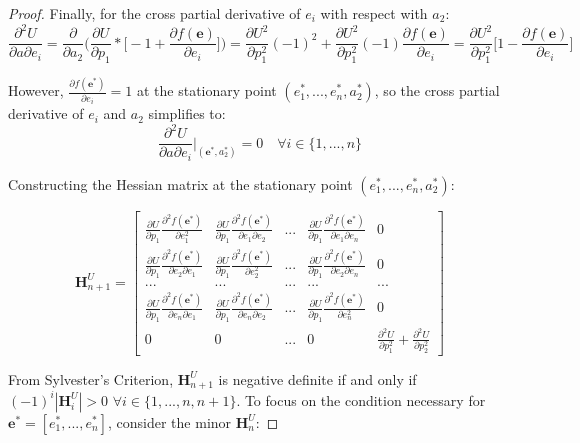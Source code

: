 \begin{proof}
Finally, for the cross partial derivative of $e_i$ with respect with $a_2$: $$\frac{\partial^2 U}{\partial a\partial e_i}=\frac{\partial}{\partial a_2}\bigg(\frac{\partial U}{\partial p_1}*\bigg[-1+\frac{\partial f(\mathbf{e})}{\partial e_i}\bigg]\bigg)=\frac{\partial U^2}{\partial p_1^2}(-1)^2+\frac{\partial U^2}{\partial p_1^2}(-1)\frac{\partial f(\mathbf{e})}{\partial e_i}=\frac{\partial U^2}{\partial p_1^2}\bigg[1-\frac{\partial f(\mathbf{e})}{\partial e_i}\bigg]$$

However, $\frac{\partial f(\mathbf{e^*})}{\partial e_i}=1$ at the stationary point $(e_1^*,...,e^*_n,a_2^*)$, so the cross partial derivative of $e_i$ and $a_2$ simplifies to:
$$\frac{\partial^2 U}{\partial a\partial e_i}\bigg|_{(\mathbf{e}^*,a^*_2)}=0\quad\forall i\in\{1,...,n\}$$

Constructing the Hessian matrix at the stationary point $(e^*_1,...,e^*_n,a^*_2)$:

$$\mathbf{H}^U_{n+1}=\begin{bmatrix}
\frac{\partial U}{\partial p_1}\frac{\partial^2 f(\mathbf{e}^*)}{\partial e_1^2} & \frac{\partial U}{\partial p_1}\frac{\partial^2 f(\mathbf{e}^*)}{\partial e_1\partial e_2} & ... & \frac{\partial U}{\partial p_1}\frac{\partial^2 f(\mathbf{e}^*)}{\partial e_1\partial e_n} & 0\\
\frac{\partial U}{\partial p_1}\frac{\partial^2 f(\mathbf{e}^*)}{\partial e_2\partial e_1} & \frac{\partial U}{\partial p_1}\frac{\partial^2 f(\mathbf{e}^*)}{\partial e_2^2} & ... & \frac{\partial U}{\partial p_1}\frac{\partial^2 f(\mathbf{e}^*)}{\partial e_2\partial e_n} & 0\\
... & ... & ... & ... & ...\\
\frac{\partial U}{\partial p_1}\frac{\partial^2 f(\mathbf{e}^*)}{\partial e_n\partial e_1} & \frac{\partial U}{\partial p_1}\frac{\partial^2 f(\mathbf{e}^*)}{\partial e_n\partial e_2} & ... & \frac{\partial U}{\partial p_1}\frac{\partial^2 f(\mathbf{e}^*)}{\partial e_n^2} & 0\\
0 & 0 & ... & 0 & \frac{\partial^2 U}{\partial p_1^2}+\frac{\partial^2 U}{\partial p_2^2}
\end{bmatrix}$$

From Sylvester's Criterion, $\mathbf{H}^U_{n+1}$ is negative definite if and only if $(-1)^i|\mathbf{H}^U_i|>0$ $\forall i\in\{1,...,n,n+1\}$. To focus on the condition necessary for $\mathbf{e}^*=[e^*_1,...,e^*_n]$, consider the minor $\mathbf{H}^U_n$:


\end{proof}
